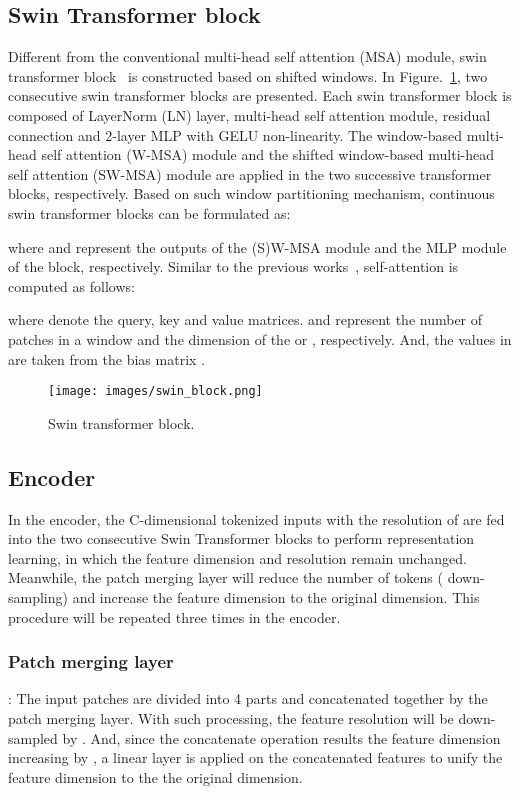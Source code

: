 \documentclass[runningheads]{llncs}
\begin{document}
\subsection{Swin Transformer block}
Different from the conventional multi-head self attention (MSA) module, swin transformer block~\cite{swin} is constructed based on shifted windows. In Figure.~\ref{swin_block}, two consecutive swin transformer blocks are presented. Each swin transformer block is composed of LayerNorm (LN) layer, multi-head self attention module, residual connection and 2-layer MLP with GELU non-linearity. The window-based multi-head self attention (W-MSA) module and the shifted window-based multi-head self attention (SW-MSA) module are applied in the two successive transformer blocks, respectively. Based on such window partitioning mechanism, continuous swin transformer blocks can be formulated as:









where  and  represent the outputs of the (S)W-MSA module and the MLP module of the  block, respectively. Similar to the previous works~\cite{relation,local}, self-attention is computed as follows:


where  denote the query, key and value matrices.  and  represent the number of patches in a window and the dimension of the  or , respectively. And,  the values in  are taken from the bias matrix . 

\begin{figure}[t!]
\centering
\texttt{[image: images/swin\_block.png]}
\caption{Swin transformer block.} \label{swin_block}
\end{figure}

\subsection{Encoder}

In the encoder, 
the C-dimensional tokenized inputs with the resolution of  are fed into the two consecutive Swin Transformer blocks to perform representation learning, in which the feature dimension and resolution remain unchanged. Meanwhile, 
the patch merging layer will reduce the number of tokens ( down-sampling) and increase the feature dimension to  the original dimension. This procedure will be repeated three times in the encoder.

\subsubsection{Patch merging layer}:
The input patches are divided into 4 parts and concatenated together by the patch merging layer. With such processing, the feature resolution will be down-sampled by . And, since the concatenate operation results the feature dimension increasing by , a linear layer is applied on the concatenated features to unify the feature dimension to the  the original dimension.
\end{document}

